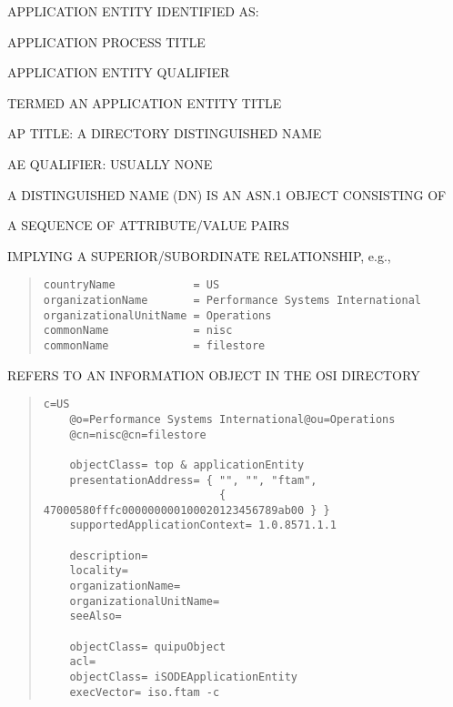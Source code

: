 \begin{bwslide}

\begin{nrtc}
\item	APPLICATION ENTITY IDENTIFIED AS:
    \begin{nrtc}
    \item	APPLICATION PROCESS TITLE

    \item	APPLICATION ENTITY QUALIFIER
    \end{nrtc}
    TERMED AN APPLICATION ENTITY TITLE

\item	AP TITLE: A DIRECTORY DISTINGUISHED NAME

\item	AE QUALIFIER: USUALLY NONE
\end{nrtc}
\end{bwslide}


\begin{bwslide}

\begin{nrtc}
\item	A DISTINGUISHED NAME (DN) IS AN ASN.1 OBJECT CONSISTING OF
    \begin{nrtc}
    \item	A SEQUENCE OF ATTRIBUTE/VALUE PAIRS
    \end{nrtc}
    IMPLYING A SUPERIOR/SUBORDINATE RELATIONSHIP, e.g.,
\begin{quote}\small\begin{verbatim}
countryName            = US
organizationName       = Performance Systems International
organizationalUnitName = Operations
commonName             = nisc
commonName             = filestore
\end{verbatim}\end{quote}

\item	REFERS TO AN INFORMATION OBJECT IN THE OSI DIRECTORY
\end{nrtc}
\end{bwslide}


\begin{bwslide}

\begin{quote}\small\begin{verbatim}
c=US
    @o=Performance Systems International@ou=Operations
    @cn=nisc@cn=filestore

    objectClass= top & applicationEntity
    presentationAddress= { "", "", "ftam",
                           { 47000580fffc000000000100020123456789ab00 } }
    supportedApplicationContext= 1.0.8571.1.1

    description=
    locality=
    organizationName=
    organizationalUnitName=
    seeAlso=

    objectClass= quipuObject
    acl=
    objectClass= iSODEApplicationEntity
    execVector= iso.ftam -c
\end{verbatim}\end{quote}
\end{bwslide}


